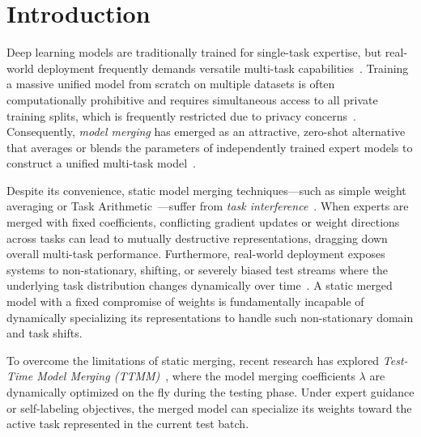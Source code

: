 \documentclass{article}
\theoremstyle{plain}
\theoremstyle{definition}
\theoremstyle{remark}
\begin{document}
\section{Introduction}
\label{submission-intro}

Deep learning models are traditionally trained for single-task expertise, but real-world deployment frequently demands versatile multi-task capabilities~\citep{yosinski2014transferable, pan2009survey, bengio2012representation}. Training a massive unified model from scratch on multiple datasets is often computationally prohibitive and requires simultaneous access to all private training splits, which is frequently restricted due to privacy concerns~\citep{zhang2022survey}. Consequently, \textit{model merging} has emerged as an attractive, zero-shot alternative that averages or blends the parameters of independently trained expert models to construct a unified multi-task model~\citep{ilharco2022editing, wortsman2022model, matena2021merging, choshen2022fusing}.

Despite its convenience, static model merging techniques—such as simple weight averaging or Task Arithmetic~\citep{ilharco2022editing}—suffer from \textit{task interference}~\citep{yadav2023resolving}. When experts are merged with fixed coefficients, conflicting gradient updates or weight directions across tasks can lead to mutually destructive representations, dragging down overall multi-task performance. Furthermore, real-world deployment exposes systems to non-stationary, shifting, or severely biased test streams where the underlying task distribution changes dynamically over time~\citep{wang2021tent, wang2022continual, shao2023test}. A static merged model with a fixed compromise of weights is fundamentally incapable of dynamically specializing its representations to handle such non-stationary domain and task shifts.

To overcome the limitations of static merging, recent research has explored \textit{Test-Time Model Merging (TTMM)}~\citep{zhao2024test, li2024collaborative, huitong2025codemerge}, where the model merging coefficients $\lambda$ are dynamically optimized on the fly during the testing phase. Under expert guidance or self-labeling objectives, the merged model can specialize its weights toward the active task represented in the current test batch. 
\end{document}
